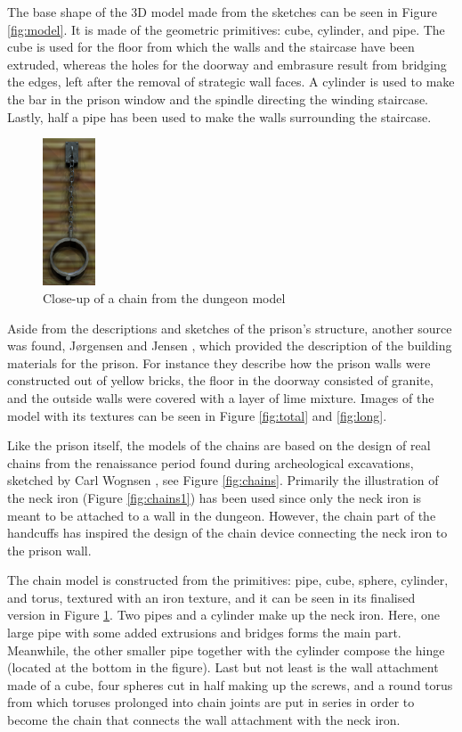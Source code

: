 The base shape of the 3D model made from the sketches can be seen in Figure \ref{fig:model}. It is made of the geometric primitives: cube, cylinder, and pipe. The cube is used for the floor from which the walls and the staircase have been extruded, whereas the holes for the doorway and embrasure result from bridging the edges, left after the removal of strategic wall faces. A cylinder is used to make the bar in the prison window and the spindle directing the winding staircase. Lastly, half a pipe has been used to make the walls surrounding the staircase.

\begin{figure}
   \centering
   \includegraphics[width=0.14\textwidth]{figures/chainmodel.png}
   \caption{Close-up of a chain from the dungeon model}\label{fig:chain_model}
\end{figure}

Aside from the descriptions and sketches of the prison’s structure, another source was found, Jørgensen \cite{Jorgensen1934} and Jensen \cite{Jensen1909}, which provided the description of the building materials for the prison. For instance they describe how the prison walls were constructed out of yellow bricks, the floor in the doorway consisted of granite, and the outside walls were covered with a layer of lime mixture. Images of the model with its textures can be seen in Figure \ref{fig:total} and \ref{fig:long}.

Like the prison itself, the models of the chains are based on the design of real chains from the renaissance period found during archeological excavations, sketched by Carl Wognsen \cite{Riismoller1961}, see Figure \ref{fig:chains}. Primarily the illustration of the neck iron (Figure \ref{fig:chains1}) has been used since only the neck iron is meant to be attached to a wall in the dungeon. However, the chain part of the handcuffs has inspired the design of the chain device connecting the neck iron to the prison wall.

The chain model is constructed from the primitives: pipe, cube, sphere, cylinder, and torus, textured with an iron texture, and it can be seen in its finalised version in  Figure \ref{fig:chain_model}. 
Two pipes and a cylinder make up the neck iron. Here, one large pipe with some added extrusions and bridges forms the main part. Meanwhile, the other smaller pipe together with the cylinder compose the hinge (located at the bottom in the figure). Last but not least is the wall attachment made of a cube, four spheres cut in half making up the screws, and a round torus from which toruses prolonged into chain joints are put in series in order to become the chain that connects the wall attachment with the neck iron.

